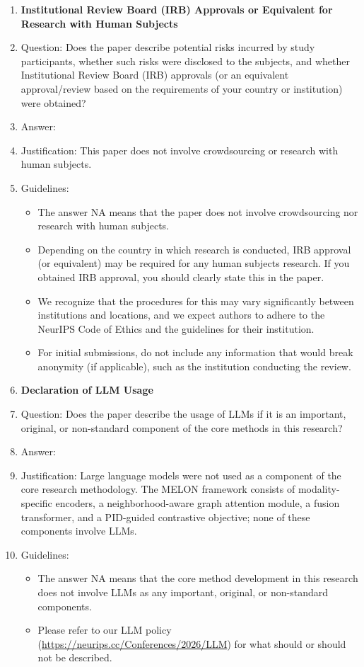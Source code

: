 \documentclass{article}
\theoremstyle{plain}
\theoremstyle{definition}
\begin{document}
\begin{enumerate}
  \item {\bf Institutional Review Board (IRB) Approvals or Equivalent for Research with Human Subjects}
  \item[] Question: Does the paper describe potential risks incurred by study participants, whether such risks were disclosed to the subjects, and whether Institutional Review Board (IRB) approvals (or an equivalent approval/review based on the requirements of your country or institution) were obtained?
  \item[] Answer: \answerNA{}
  \item[] Justification: This paper does not involve crowdsourcing or research with human subjects.
  \item[] Guidelines:
    \begin{itemize}
      \item The answer NA means that the paper does not involve crowdsourcing nor research with human subjects.
      \item Depending on the country in which research is conducted, IRB approval (or equivalent) may be required for any human subjects research. If you obtained IRB approval, you should clearly state this in the paper.
      \item We recognize that the procedures for this may vary significantly between institutions and locations, and we expect authors to adhere to the NeurIPS Code of Ethics and the guidelines for their institution.
      \item For initial submissions, do not include any information that would break anonymity (if applicable), such as the institution conducting the review.
    \end{itemize}

  \item {\bf Declaration of LLM Usage}
  \item[] Question: Does the paper describe the usage of LLMs if it is an important, original, or non-standard component of the core methods in this research?
  \item[] Answer: \answerNA{}
  \item[] Justification: Large language models were not used as a component of the core research methodology. The MELON framework consists of modality-specific encoders, a neighborhood-aware graph attention module, a fusion transformer, and a PID-guided contrastive objective; none of these components involve LLMs.
  \item[] Guidelines:
    \begin{itemize}
      \item The answer NA means that the core method development in this research does not involve LLMs as any important, original, or non-standard components.
      \item Please refer to our LLM policy (\url{https://neurips.cc/Conferences/2026/LLM}) for what should or should not be described.
    \end{itemize}

\end{enumerate}
\end{document}
